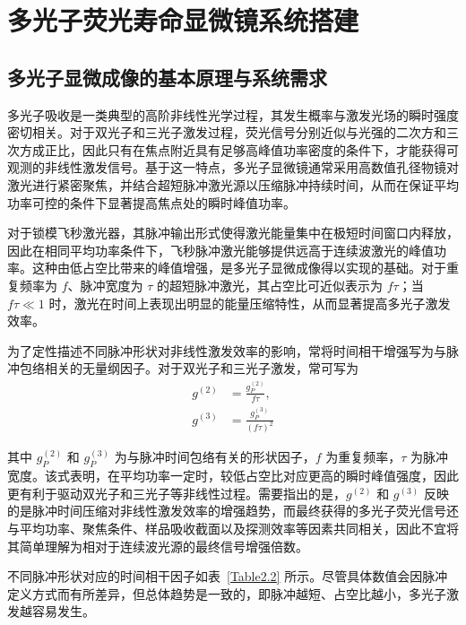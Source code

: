 \chapter{多光子荧光寿命显微镜系统搭建}\label{Chap:4}

\section{多光子显微成像的基本原理与系统需求}\label{4.1}

多光子吸收是一类典型的高阶非线性光学过程，其发生概率与激发光场的瞬时强度密切相关。对于双光子和三光子激发过程，荧光信号分别近似与光强的二次方和三次方成正比，因此只有在焦点附近具有足够高峰值功率密度的条件下，才能获得可观测的非线性激发信号。基于这一特点，多光子显微镜通常采用高数值孔径物镜对激光进行紧密聚焦，并结合超短脉冲激光源以压缩脉冲持续时间，从而在保证平均功率可控的条件下显著提高焦点处的瞬时峰值功率。

对于锁模飞秒激光器，其脉冲输出形式使得激光能量集中在极短时间窗口内释放，因此在相同平均功率条件下，飞秒脉冲激光能够提供远高于连续波激光的峰值功率。这种由低占空比带来的峰值增强，是多光子显微成像得以实现的基础。对于重复频率为 $f$、脉冲宽度为 $\tau$ 的超短脉冲激光，其占空比可近似表示为 $f\tau$；当 $f\tau \ll 1$ 时，激光在时间上表现出明显的能量压缩特性，从而显著提高多光子激发效率。

为了定性描述不同脉冲形状对非线性激发效率的影响，常将时间相干增强写为与脉冲包络相关的无量纲因子。对于双光子和三光子激发，常可写为
\begin{align}
  g^{(2)} &= \frac{g_P^{(2)}}{f\tau},\\
  g^{(3)} &= \frac{g_P^{(3)}}{(f\tau)^2}
\end{align}

其中 $g_P^{(2)}$ 和 $g_P^{(3)}$ 为与脉冲时间包络有关的形状因子，$f$ 为重复频率，$\tau$ 为脉冲宽度。该式表明，在平均功率一定时，较低占空比对应更高的瞬时峰值强度，因此更有利于驱动双光子和三光子等非线性过程。需要指出的是，$g^{(2)}$ 和 $g^{(3)}$ 反映的是脉冲时间压缩对非线性激发效率的增强趋势，而最终获得的多光子荧光信号还与平均功率、聚焦条件、样品吸收截面以及探测效率等因素共同相关，因此不宜将其简单理解为相对于连续波光源的最终信号增强倍数。

不同脉冲形状对应的时间相干因子如表~\ref{Table2.2} 所示。尽管具体数值会因脉冲定义方式而有所差异，但总体趋势是一致的，即脉冲越短、占空比越小，多光子激发越容易发生。

